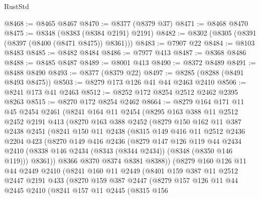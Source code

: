 \begin{lexlean}{RustStd}
\begin{coremodule}
@8468 := @8465 @8467
@8470 := @8377 (@8379 @37)
@8471 := @8468 @8470
@8475 := @8348 (@8383 (@8384 @2191) @2191)
@8482 := @8302 (@8305 (@8391 (@8397 (@8400 (@8471 @8475)) @8361)))
@8483 := @7907 @22
@8484 := @8103 @8483
@8485 := @8482 @8484
@8486 := @7977 @413
@8487 := @8368 @8486
@8488 := @8485 @8487
@8489 := @8001 @413
@8490 := @8372 @8489
@8491 := @8488 @8490
@8493 := @8377 (@8379 @22)
@8497 := @8285 (@8288 (@8491 @8493 @8475))
@8503 := @8279 @173 @126 @41 @44 @2463 @2410
@8506 := @8241 @173 @41 @2463
@8512 := @8252 @172 @8254 @2512 @2462 @2395 @8263
@8515 := @8270 @172 @8254 @2462
@8664 := @8279
    @164
    @171
    @11
    @45
    @2454
    @2461
    (@8241
      @164
      @11
      @2454
      (@8295
        @163
        @388
        @11
        @2512
        @2452
        @2191
        @413
        (@8270
          @163
          @388
          @2452
          (@8279
            @150
            @162
            @11
            @387
            @2438
            @2451
            (@8241
              @150
              @11
              @2438
              (@8315
                @149
                @416
                @11
                @2512
                @2436
                @2204
                @423
                (@8270
                  @149
                  @416
                  @2436
                  (@8279
                    @147
                    @126
                    @119
                    @44
                    @2434
                    @2410
                    (@8338 @146 @2434 (@8343 (@8344 @2434)) (@8348 (@8350 @146 @119)))
                    @8361))
                @8366
                @8370
                @8374
                @8381
                @8388))
            (@8279
              @160
              @126
              @11
              @44
              @2449
              @2410
              (@8241
                @160
                @11
                @2449
                (@8401
                  @159
                  @387
                  @11
                  @2512
                  @2447
                  @2191
                  @433
                  (@8270
                    @159
                    @387
                    @2447
                    (@8279
                      @157
                      @126
                      @11
                      @44
                      @2445
                      @2410
                      (@8241
                        @157
                        @11
                        @2445
                        (@8315
                          @156

\end{coremodule}
\end{lexlean}
